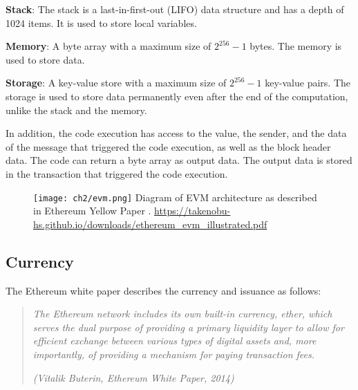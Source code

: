 \begin{list}{-}{}
   \item \textbf{Stack}: The stack is a last-in-first-out (LIFO) data structure and has a depth of 1024 items. It is used to store local variables.
   \item \textbf{Memory}: A byte array with a maximum size of $2^{256} - 1$ bytes. The memory is used to store data.
   \item \textbf{Storage}: A key-value store with a maximum size of $2^{256} - 1$ key-value pairs. The storage is used to store data permanently even after the end
         of the computation, unlike the stack and the memory.
\end{list}


In addition, the code execution has access to the value, the sender, and the data of the message that triggered the code execution, as well as
the block header data. The code can return a byte array as output data. The output data is stored in the transaction that triggered the code execution.


\begin{figure}[H]
   \centering
   \texttt{[image: ch2/evm.png]}
   {Diagram of EVM architecture as described in Ethereum Yellow Paper \cite{ethereum_yellow_paper}.
   }{\url{https://takenobu-hs.github.io/downloads/ethereum_evm_illustrated.pdf}}
   \label{fig:evm}
\end{figure}


\subsection{Currency}
\label{subsec:currency_and_issuance}


The Ethereum white paper \cite{ethereum_white_paper} describes the currency and issuance as follows:




\begin{quote}
  \textit{The Ethereum network includes its own built-in currency, ether, which serves the dual purpose of providing a primary
      liquidity layer to allow for efficient exchange between various types of digital assets and, more importantly, of providing a
      mechanism for paying transaction fees.}




  \textit{(Vitalik Buterin, Ethereum White Paper, 2014)}
\end{quote}




